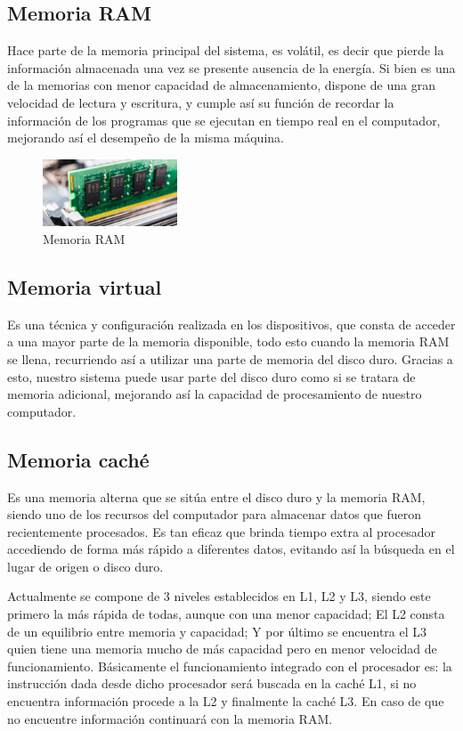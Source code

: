 \documentclass{article}
\begin{document}
\subsection{Memoria RAM}
\noindent Hace parte de la memoria principal del sistema, es volátil, es decir que pierde la información almacenada una vez se presente ausencia de la energía. Si bien es una de la memorias con menor capacidad de almacenamiento, dispone de una gran velocidad de lectura y escritura, y cumple así su función de recordar la información de los programas que se ejecutan en tiempo real en el computador, mejorando así el desempeño de la misma máquina. \cite{ram}
\begin{figure}[h]
\includegraphics[width=4cm]{ram.jpg}
\centering
\caption{Memoria RAM}
\end{figure}

\subsection{Memoria virtual}
\noindent Es una técnica y configuración realizada en los dispositivos, que consta de acceder a una mayor parte de la memoria disponible, todo esto cuando la memoria RAM se llena, recurriendo así a utilizar una parte de memoria del disco duro. Gracias a esto, nuestro sistema puede usar parte del disco duro como si se tratara de memoria adicional, mejorando así la capacidad de procesamiento de nuestro computador. \cite{memoriavirtual}

\subsection{Memoria caché}
\noindent Es una memoria alterna que se sitúa entre el disco duro y la memoria RAM, siendo uno de los recursos del computador para almacenar datos que fueron recientemente procesados. Es tan eficaz que brinda tiempo extra al procesador accediendo de forma más rápido a diferentes datos, evitando así la búsqueda en el lugar de origen o disco duro.\cite{velocidad} \\

\vspace{1mm}

\noindent Actualmente se compone de 3 niveles establecidos en L1, L2 y L3, siendo este primero la más rápida de todas, aunque con una menor capacidad; El L2 consta de un equilibrio entre memoria y capacidad; Y por último se encuentra el L3 quien tiene una memoria mucho de más capacidad pero en menor velocidad de funcionamiento. Básicamente el funcionamiento integrado con el procesador es: la instrucción dada desde dicho procesador será buscada en la caché L1, si no encuentra información procede a la L2 y finalmente la caché L3. En caso de que no encuentre información continuará con la memoria RAM. 
\end{document}
